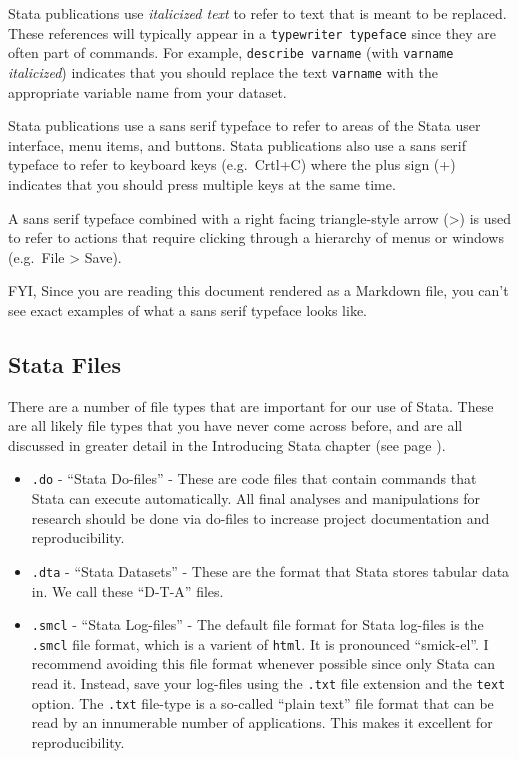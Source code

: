 \documentclass[]{book}
\begin{document}
Stata publications use \emph{italicized text} to refer to text that is
meant to be replaced. These references will typically appear in a
\texttt{typewriter\ typeface} since they are often part of commands. For
example, \texttt{describe\ varname} (with \texttt{varname}
\emph{italicized}) indicates that you should replace the text
\texttt{varname} with the appropriate variable name from your dataset.

Stata publications use a sans serif typeface to refer to areas of the
Stata user interface, menu items, and buttons. Stata publications also
use a sans serif typeface to refer to keyboard keys (e.g.~Crtl+C) where
the plus sign (+) indicates that you should press multiple keys at the
same time.

A sans serif typeface combined with a right facing triangle-style arrow
(\textgreater{}) is used to refer to actions that require clicking
through a hierarchy of menus or windows (e.g.~File \textgreater{} Save).

FYI, Since you are reading this document rendered as a Markdown file,
you can't see exact examples of what a sans serif typeface looks like.

\subsection{Stata Files}\label{stata-files}

There are a number of file types that are important for our use of
Stata. These are all likely file types that you have never come across
before, and are all discussed in greater detail in the Introducing Stata
chapter (see page ).

\begin{itemize}
\item
  \texttt{.do} - ``Stata Do-files'' - These are code files that contain
  commands that Stata can execute automatically. All final analyses and
  manipulations for research should be done via do-files to increase
  project documentation and reproducibility.
\item
  \texttt{.dta} - ``Stata Datasets'' - These are the format that Stata
  stores tabular data in. We call these ``D-T-A'' files.
\item
  \texttt{.smcl} - ``Stata Log-files'' - The default file format for
  Stata log-files is the \texttt{.smcl} file format, which is a varient
  of \texttt{html}. It is pronounced ``smick-el''. I recommend avoiding
  this file format whenever possible since only Stata can read it.
  Instead, save your log-files using the \texttt{.txt} file extension
  and the \texttt{text} option. The \texttt{.txt} file-type is a
  so-called ``plain text'' file format that can be read by an
  innumerable number of applications. This makes it excellent for
  reproducibility.
\end{itemize}
\end{document}
